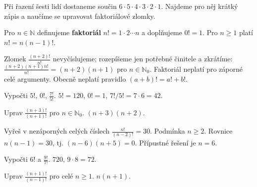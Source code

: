 \documentclass[11pt,a4paper]{article}
\begin{document}

Při řazení šesti lidí dostaneme součin $6\cdot5\cdot4\cdot3\cdot2\cdot1$. Najdeme pro něj krátký zápis a naučíme se upravovat faktoriálové zlomky.



\begin{definiceBox}
Pro $n\in\mathbb N$ definujeme \textbf{faktoriál} $n!=1\cdot2\cdots n$ a doplňujeme $0!=1$. Pro $n\ge1$ platí $n!=n(n-1)!$.
\end{definiceBox}
Zlomek $\frac{(n+2)!}{n!}$ nevyčíslujeme; rozepíšeme jen potřebné činitele a zkrátíme: $\frac{(n+2)(n+1)n!}{n!}=(n+2)(n+1)$ pro $n\in\mathbb N_0$. Faktoriál neplatí pro záporné celé argumenty. Obecně neplatí pravidlo $(a+b)!=a!+b!$.


\begin{prikladReseniBox}[title={Příklad 1}]
Vypočti $5!$, $0!$, $\frac{7!}{5!}$.
\tcblower
$5!=120$, $0!=1$, $7!/5!=7\cdot6=42$.
\end{prikladReseniBox}



\begin{prikladReseniBox}[title={Příklad 2}]
Uprav $\frac{(n+3)!}{(n+1)!}$ pro $n\in\mathbb N_0$.
\tcblower
$(n+3)(n+2)$.
\end{prikladReseniBox}



\begin{prikladReseniBox}[title={Příklad 3}]
Vyřeš v nezáporných celých číslech $\frac{n!}{(n-2)!}=30$.
\tcblower
Podmínka $n\ge2$. Rovnice $n(n-1)=30$, tj. $(n-6)(n+5)=0$. Přípustné řešení je $n=6$.
\end{prikladReseniBox}




\begin{zadaniReseniBox}[title={Samostatná práce 1}]
Vypočti $6!$ a $\frac{9!}{7!}$.
\tcblower
$720$, $9\cdot8=72$.
\end{zadaniReseniBox}



\begin{zadaniReseniBox}[title={Samostatná práce 2}]
Uprav $\frac{(n+1)!}{(n-1)!}$ pro celé $n\ge1$.
\tcblower
$n(n+1)$.
\end{zadaniReseniBox}
\end{document}

